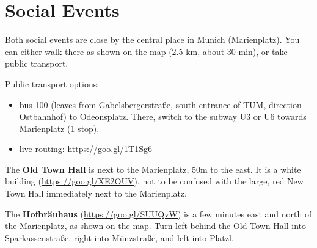 \newpage
\section*{Social Events}

Both social events are close by the central place in Munich (Marienplatz).
You can either walk there as shown on the map (2.5 km, about 30 min), or
take public transport.

Public transport options:
\begin{itemize}
 \item bus 100 (leaves from Gabelsbergerstraße, south entrance of TUM, direction Ostbahnhof) to Odeonsplatz. There, switch to the subway U3 or U6 towards Marienplatz (1 stop).
 \item live routing: \url{https://goo.gl/1T1Sg6}
\end{itemize}

\vspace{2mm}
The \textbf{Old Town Hall} is next to the Marienplatz, 50m to the east. It is a white building (\url{https://goo.gl/XE2OUV}), not to be confused with the large, red New Town Hall
immediately next to the Marienplatz.

\vspace{2mm}
The \textbf{Hofbräuhaus} (\url{https://goo.gl/SUUQvW}) is a few minutes east and north of the Marienplatz, as shown on the map. Turn left behind the Old Town Hall into Sparkassenstraße, right into Münzstraße, and left into Platzl.
